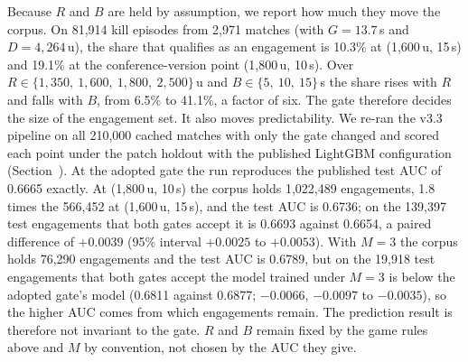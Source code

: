 Because $R$ and $B$ are held by assumption, we report how much they move the corpus. On 81,914 kill
episodes from 2,971 matches (with $G = 13.7$\,s and $D = 4{,}264$\,u), the share that qualifies as an
engagement is 10.3\% at (1,600\,u, 15\,s) and 19.1\% at the conference-version point (1,800\,u,
10\,s). Over $R \in \{1{,}350,\ 1{,}600,\ 1{,}800,\ 2{,}500\}$\,u and $B \in \{5,\ 10,\ 15\}$\,s the
share rises with $R$ and falls with $B$, from 6.5\% to 41.1\%, a factor of six.
The gate therefore decides the size of the engagement set. It also moves predictability. We re-ran the
v3.3 pipeline on all 210,000 cached matches with only the gate changed and scored each point under the
patch holdout with the published LightGBM configuration (Section~). At the
adopted gate the run reproduces the published test AUC of 0.6665 exactly. At (1,800\,u, 10\,s) the corpus
holds 1,022,489 engagements, 1.8 times the 566,452 at (1,600\,u, 15\,s), and the test AUC is 0.6736; on
the 139,397 test engagements that both gates accept it is 0.6693 against 0.6654, a paired difference of
$+0.0039$ (95\% interval $+0.0025$ to $+0.0053$). With $M = 3$ the corpus holds 76,290 engagements and
the test AUC is 0.6789, but on the 19,918 test engagements that both gates accept the model trained under
$M = 3$ is below the adopted gate's model (0.6811 against 0.6877; $-0.0066$, $-0.0097$ to $-0.0035$), so
the higher AUC comes from which engagements remain. The prediction result is therefore not invariant to the
gate. $R$ and $B$ remain fixed by the game rules above and $M$ by convention, not chosen by the AUC they
give.

